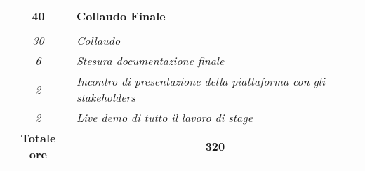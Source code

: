 \begin{tabularx}{\textwidth}{|c|X|}
    \textbf{40}            & \textbf{Collaudo Finale}
    \\ \hdashline

    \multirow{4}{0cm}
    \\
    \textit{30}            &
    \textit{Collaudo}
    \\
    \textit{6}             &
    \textit{Stesura documentazione finale}
    \\
    \textit{2}             &
    \textit{Incontro di presentazione della piattaforma con gli stakeholders}
    \\
    \textit{2}             &
    \textit{Live demo di tutto il lavoro di stage}
    \\
    \hline

    \textbf{Totale ore}    & \multicolumn{1}{|c|}{\textbf{320}}
    \\\hline

\end{tabularx}